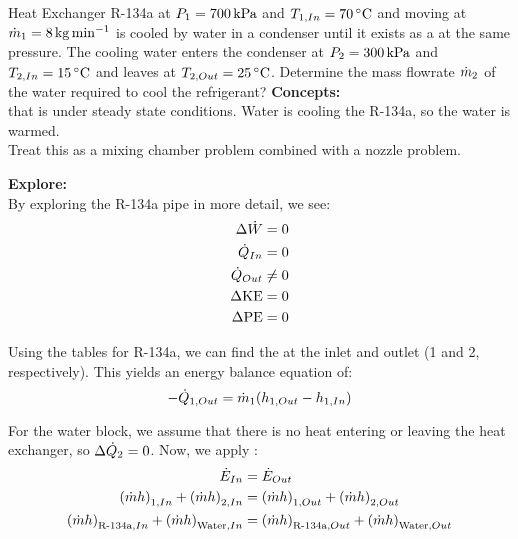 \begin{example}{Heat Exchanger}
  R-134a at $P_{1} = \SI{700}{\kilo\pascal}$ and $\Temp_{1, In} = \SI{70}{\degreeCelsius}$ and moving at $\dot{m}_{1} = \SI{8}{\kilo\gram\per\minute}$ is cooled by water in a condenser until it exists as a  at the same pressure.
  The cooling water enters the condenser at $P_{2} = \SI{300}{\kilo\pascal}$ and $\Temp_{2, In} = \SI{15}{\degreeCelsius}$ and leaves at $\Temp_{2, Out} = \SI{25}{\degreeCelsius}$.
  Determine the mass flowrate $\dot{m}_{2}$ of the water required to cool the refrigerant?
  \tcblower{}
  \textbf{Concepts:} \\
   that is under steady state conditions.
  Water is cooling the R-134a, so the water is warmed. \\
  Treat this as a mixing chamber problem combined with a nozzle problem.

  \textbf{Explore:} \\
  By exploring the R-134a pipe in more detail, we see:
  \begin{align*}
    \Delta \dot{W} &= 0 \\
    \dot{Q}_{In} &= 0 \\
    \dot{Q}_{Out} &\neq 0 \\
    \Delta \mathrm{KE} &= 0 \\
    \Delta \mathrm{PE} &= 0 \\
  \end{align*}

  Using the tables for R-134a, we can find the  at the inlet and outlet (1 and 2, respectively).
  This yields an energy balance equation of:
  \begin{equation*}
    -\dot{Q}_{1, Out} = \dot{m}_{1} (h_{1, Out} - h_{1, In})
  \end{equation*}

  For the water block, we assume that there is no heat entering or leaving the heat exchanger, so $\Delta \dot{Q}_{2} = 0$.
  Now, we apply :
  \begin{align*}
    \dot{E}_{In} &= \dot{E}_{Out} \\
    {(\dot{m} h)}_{1, In} + {(\dot{m} h)}_{2, In} &= {(\dot{m} h)}_{1, Out} + {(\dot{m} h)}_{2, Out} \\
    {(\dot{m} h)}_{\text{R-134a}, In} + {(\dot{m} h)}_{\text{Water}, In} &= {(\dot{m} h)}_{\text{R-134a}, Out} + {(\dot{m} h)}_{\text{Water}, Out} \\
  \end{align*}


\end{example}
